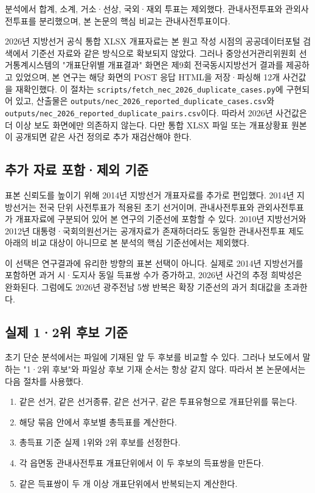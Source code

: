 \documentclass[preprint]{IEIE}
\begin{document}
분석에서 합계, 소계, 거소·선상, 국외·재외 투표는 제외했다. 관내사전투표와 관외사전투표를 분리했으며, 본 논문의 핵심 비교는 관내사전투표이다.

2026년 지방선거 공식 통합 XLSX 개표자료는 본 원고 작성 시점의 공공데이터포털 검색에서 기준선 자료와 같은 방식으로 확보되지 않았다. 그러나 중앙선거관리위원회 선거통계시스템의 "개표단위별 개표결과" 화면은 제9회 전국동시지방선거 결과를 제공하고 있었으며, 본 연구는 해당 화면의 POST 응답 HTML을 저장·파싱해 12개 사건값을 재확인했다. 이 절차는 \texttt{scripts/fetch\_nec\_2026\_duplicate\_cases.py}에 구현되어 있고, 산출물은 \texttt{outputs/nec\_2026\_reported\_duplicate\_cases.csv}와 \texttt{outputs/nec\_2026\_reported\_duplicate\_pairs.csv}이다. 따라서 2026년 사건값은 더 이상 보도 화면에만 의존하지 않는다. 다만 통합 XLSX 파일 또는 개표상황표 원본이 공개되면 같은 사건 정의로 추가 재검산해야 한다.

\subsection{추가 자료 포함·제외 기준}

표본 신뢰도를 높이기 위해 2014년 지방선거 개표자료를 추가로 편입했다. 2014년 지방선거는 전국 단위 사전투표가 적용된 초기 선거이며, 관내사전투표와 관외사전투표가 개표자료에 구분되어 있어 본 연구의 기준선에 포함할 수 있다. 2010년 지방선거와 2012년 대통령·국회의원선거는 공개자료가 존재하더라도 동일한 관내사전투표 제도 아래의 비교 대상이 아니므로 본 분석의 핵심 기준선에서는 제외했다.

이 선택은 연구결과에 유리한 방향의 표본 선택이 아니다. 실제로 2014년 지방선거를 포함하면 과거 시·도지사 동일 득표쌍 수가 증가하고, 2026년 사건의 추정 희박성은 완화된다. 그럼에도 2026년 광주전남 5쌍 반복은 확장 기준선의 과거 최대값을 초과한다.

\subsection{실제 1·2위 후보 기준}

초기 단순 분석에서는 파일에 기재된 앞 두 후보를 비교할 수 있다. 그러나 보도에서 말하는 "1·2위 후보"와 파일상 후보 기재 순서는 항상 같지 않다. 따라서 본 논문에서는 다음 절차를 사용했다.

\begin{enumerate}
\item 같은 선거, 같은 선거종류, 같은 선거구, 같은 투표유형으로 개표단위를 묶는다.
\item 해당 묶음 안에서 후보별 총득표를 계산한다.
\item 총득표 기준 실제 1위와 2위 후보를 선정한다.
\item 각 읍면동 관내사전투표 개표단위에서 이 두 후보의 득표쌍을 만든다.
\item 같은 득표쌍이 두 개 이상 개표단위에서 반복되는지 계산한다.
\end{enumerate}
\end{document}
